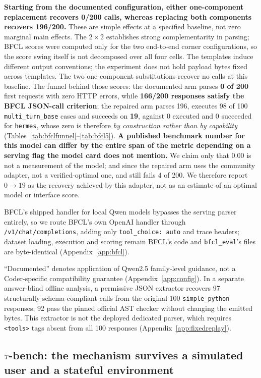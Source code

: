 \textbf{Starting from the documented configuration, either one-component replacement recovers
0/200 calls, whereas replacing both components recovers 196/200.} These are simple effects at a
specified baseline, not zero marginal main effects. The $2\times2$ establishes strong
complementarity in parsing; BFCL scores were computed only for the two end-to-end corner
configurations, so the score swing itself is not decomposed over all four cells. The templates
induce different output conventions; the experiment does not hold payload bytes fixed across
templates. The two one-component substitutions recover no calls at this baseline.
The funnel behind those scores: the documented arm parses \textbf{0 of 200} first requests with
zero HTTP errors, while \textbf{166/200 responses satisfy the BFCL JSON-call criterion};
the repaired arm parses 196, executes 98 of 100 \texttt{multi\_turn\_base} cases and
succeeds on \textbf{19}, against 0 executed and 0 succeeded for \texttt{hermes}, whose zero is
therefore \emph{by construction rather than by capability}
(Tables~\ref{tab:bfclfunnel}--\ref{tab:bfcl5}). \textbf{A published benchmark number for this
model can differ by the entire span of the metric depending on a serving flag the model card does
not mention.} We claim only that 0.00 is not a measurement of the model; and since the repaired
arm uses the community adapter, not a verified-optimal one, and still fails 4 of 200. We therefore
report $0\to19$ as the recovery achieved by this adapter, not as an estimate of an optimal model
or interface score.

BFCL's shipped handler for local Qwen models bypasses the serving parser entirely, so we route
BFCL's own OpenAI handler through \texttt{/v1/chat/completions}, adding only
\texttt{tool\_choice: auto} and trace headers; dataset loading, execution and scoring remain
BFCL's code and \texttt{bfcl\_eval}'s files are byte-identical (Appendix~\ref{app:bfcl}).

``Documented'' denotes application of Qwen2.5 family-level guidance, not a Coder-specific
compatibility guarantee (Appendix~\ref{app:config}). In a separate answer-blind offline analysis,
a permissive JSON extractor recovers 97 structurally schema-compliant calls from the original
100 \texttt{simple\_python} responses; 92 pass the pinned official AST checker without changing
the emitted bytes. This extractor is not the deployed dedicated parser, which requires
\texttt{<tools>} tags absent from all 100 responses (Appendix~\ref{app:fixedreplay}).

\subsection{$\tau$-bench: the mechanism survives a simulated user and a stateful environment}
\label{sec:tau}

